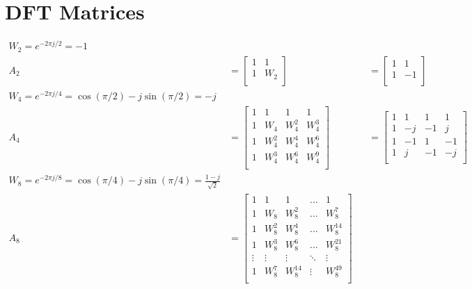 
\appendix

\section{DFT Matrices}\label{app:DFT}

\begin{align*}
	W_2 = e^{-2\pi j / 2} = -1 \\
	A_2 &= 
		\begin{bmatrix}
			1& 1 \\
			1& W_2 \\
		\end{bmatrix}
		&&= 
		\begin{bmatrix}
			1& 1 \\
			1& -1 \\
		\end{bmatrix}	 \\
	W_4 = e^{-2\pi j / 4} = \cos(\pi/2) - j\sin(\pi/2) = -j \\
	A_4 &= 
		\begin{bmatrix}
			1& 1& 1& 1 \\
			1& W_4& W_4^2& W_4^3 \\
			1& W_4^2& W_4^4& W_4^6 \\
			1& W_4^3& W_4^6& W_4^9 \\
		\end{bmatrix}
		&&=
		\begin{bmatrix}
			1& 1& 1& 1 \\
			1& -j& -1& j \\
			1& -1& 1& -1 \\
			1& j& -1& -j \\
		\end{bmatrix} \\
	W_8 = e^{-2\pi j / 8} = \cos(\pi/4) - j\sin(\pi/4) = \frac{1-j}{\sqrt{2}} \\
	A_8 &= 
		\begin{bmatrix}
			1 & 1 & 1 & \dots & 1 \\
			1 & W_8 & W_8^2 & \dots & W_8^7 \\
			1 & W_8^2 & W_8^4 & \dots & W_8^{14} \\
			1 & W_8^3 & W_8^6 & \dots & W_8^{21} \\
			\vdots & \vdots & \vdots & \ddots & \vdots \\
			1 & W_8^7 & W_8^{14} & \vdots & W_8^{49} \\
		\end{bmatrix}
\end{align*}

